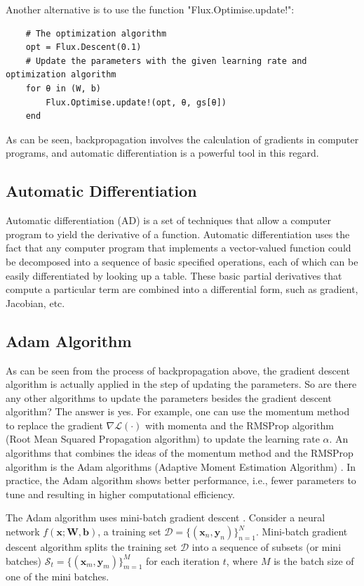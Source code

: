\documentclass[
	parskip, 			   %
	twoside, 			   %
	DIV=14, 			   %
	BCOR=15.0mm, 		   %
	headsepline, 		   %
	open=right, 		   %
	captions=tableheading, %
	bibliography=totoc,    %
	numbers=noenddot       %
]{scrreprt}
\begin{document}
Another alternative is to use the function "Flux.Optimise.update!":

\begin{verbatim}
    # The optimization algorithm
    opt = Flux.Descent(0.1)
    # Update the parameters with the given learning rate and optimization algorithm
    for θ in (W, b)
        Flux.Optimise.update!(opt, θ, gs[θ])
    end
\end{verbatim}

As can be seen, backpropagation involves the calculation of gradients in computer programs, and automatic differentiation is a powerful tool in this regard.

\subsection{Automatic Differentiation}
Automatic differentiation (AD) is a set of techniques that allow a computer program to yield the derivative of a function. Automatic differentiation uses the fact that any computer program that implements a vector-valued function could be decomposed into a sequence of basic specified operations, each of which can be easily differentiated by looking up a table. These basic partial derivatives that compute a particular term are combined into a differential form, such as gradient, Jacobian, etc.

\subsection{Adam Algorithm}
As can be seen from the process of backpropagation above, the gradient descent algorithm is actually applied in the step of updating the parameters. So are there any other algorithms to update the parameters besides the gradient descent algorithm? The answer is yes. For example, one can use the momentum method to replace the gradient $\nabla \mathcal{L}(\cdot)$ with momenta and the RMSProp algorithm (Root Mean Squared Propagation algorithm) \cite{tieleman2012divide} to update the learning rate $\alpha$. An algorithms that combines the ideas of the momentum method and the RMSProp algorithm is the Adam algorithms (Adaptive Moment Estimation Algorithm) \cite{kingma2014adam}. In practice, the Adam algorithm shows better performance, i.e., fewer parameters to tune and resulting in higher computational efficiency.

The Adam algorithm uses mini-batch gradient descent \cite{bottou2010large}. Consider a neural network $f(\mathbf{x};\mathbf{W},\mathbf{b})$, a training set $\mathcal{D}=\{ (\mathbf{x}_{n}, \mathbf{y}_{n}) \}_{n=1}^{N}$. Mini-batch gradient descent algorithm splits the training set $\mathcal{D}$ into a sequence of subsets (or mini batches) $\mathcal{S}_t=\{(\mathbf{x}_{m}, \mathbf{y}_{m}) \}_{m=1}^{M}$ for each iteration $t$, where $M$ is the batch size of one of the mini batches.
\end{document}
